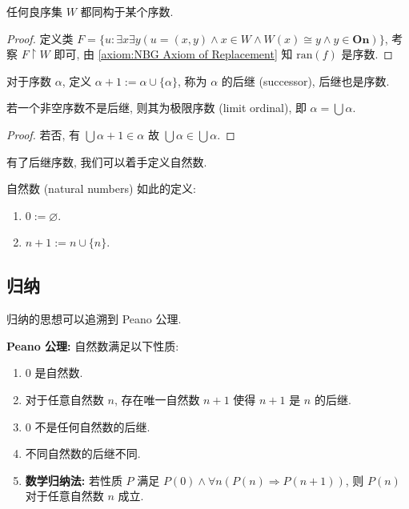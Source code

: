 \begin{lemma}
    任何良序集 \(W\) 都同构于某个序数.

    \begin{proof}
        定义类 \(F = \{u : \exists x \exists y(u=(x,y) \land x \in W \land W(x) \cong y \land y \in \mathbf{On})\}\), 
        考察 \(F \upharpoonright W\) 即可, 由 \ref{axiom:NBG Axiom of Replacement} 知 \(\mathrm{ran} (f)\) 是序数.
    \end{proof}
\end{lemma}

\begin{definition}
    对于序数 \(\alpha\), 定义 \(\alpha + 1 := \alpha \cup \{\alpha\}\), 称为 \(\alpha\) 的后继 (successor), 后继也是序数.
\end{definition}

\begin{corollary}
    \label{corollary:ordinal numbers are successors or limits}
    若一个非空序数不是后继, 则其为极限序数 (limit ordinal), 即 \(\alpha = \bigcup \alpha\).

    \begin{proof}
        若否, 有 \(\bigcup \alpha + 1 \in \alpha\) 故 \(\bigcup \alpha \in \bigcup \alpha\).
    \end{proof}
\end{corollary}

有了后继序数, 我们可以着手定义自然数.

\begin{definition}
    \label{definition:natural numbers}
    自然数 (natural numbers) 如此的定义:
    \begin{enumerate}
        \item \(0 := \varnothing\).
        \item \(n + 1 := n \cup \{n\}\).
    \end{enumerate}
\end{definition}

\subsection{归纳}

归纳的思想可以追溯到 Peano 公理.

\begin{example}
    \textbf{Peano 公理:} 自然数满足以下性质:
    \begin{enumerate}
        \item \(0\) 是自然数.
        \item 对于任意自然数 \(n\), 存在唯一自然数 \(n+1\) 使得 \(n+1\) 是 \(n\) 的后继.
        \item \(0\) 不是任何自然数的后继.
        \item 不同自然数的后继不同.
        \item \textbf{数学归纳法:} 若性质 \(P\) 满足 \(P(0) \land \forall n (P(n) \Rightarrow P(n+1))\), 则 \(P(n)\) 对于任意自然数 \(n\) 成立. 
    \end{enumerate}
\end{example}

